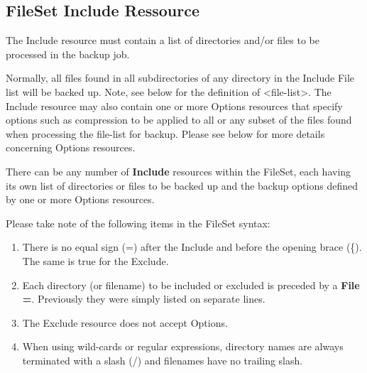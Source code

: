 \subsection{FileSet Include Ressource}
\label{fileset-include}

The Include resource must contain a list of directories and/or files to be
processed in the backup job.  

Normally, all files found in all
subdirectories of any directory in the Include File list will be backed up.
Note, see below for the definition of {\textless}file-list{\textgreater}.
The Include resource may also contain one or more Options resources that
specify options such as compression to be applied to all or any subset of
the files found when processing the file-list for backup. Please see
below for more details concerning Options resources.

There can be any number of {\bf Include} resources within the FileSet, each
having its own list of directories or files to be backed up and the backup
options defined by one or more Options resources.  

Please take note of the following items in the FileSet syntax:

\begin{enumerate}
\item There is no equal sign (=) after the Include and before the opening
   brace (\{). The same is true for the Exclude.
\item Each directory (or filename) to be included or excluded is preceded by a {\bf File
   =}.  Previously they were simply listed on separate lines.
\item The Exclude resource does not accept Options.
\item When using wild-cards or regular expressions, directory names are
   always terminated with a slash (/) and filenames have no trailing slash.
\end{enumerate}


